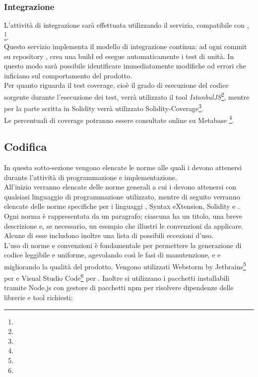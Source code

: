 \documentclass[NormeDiProgetto.tex]{subfiles}
\begin{document}
\subsubsection{Integrazione}
L'attività di integrazione sarà effettuata utilizzando il servizio, compatibile con , \textit{}\footnote{}.\\
Questo servizio implementa il modello di integrazione continua: ad ogni commit su repository ,  crea una build ed esegue automaticamente i test di unità. In questo modo sarà possibile identificare immediatamente modifiche od errori che inficiano sul comportamento del prodotto.\\
Per quanto riguarda il test coverage, cioè il grado di esecuzione del codice sorgente durante l'esecuzione dei test, verrà utilizzato il tool  \textit{IstanbulJS}\footnote{}, mentre per la parte scritta in Solidity verrà utilizzato Solidity-Coverage\footnote{}.\\
Le percentuali di coverage potranno essere consultate online su Metabase \footnote{}.

\subsection{Codifica}
In questa sotto-sezione vengono elencate le norme alle quali i \progri devono attenersi durante l'attività di programmazione e implementazione.\\
All'inizio verranno elencate delle norme generali a cui i \progri devono attenersi con qualsiasi linguaggio di programmazione utilizzato, mentre di seguito verranno elencate delle norme specifiche per i linguaggi ,  Syntax eXtension, Solidity e .\\
Ogni norma è rappresentata da un paragrafo; ciascuna ha un titolo, una breve descrizione e, se necessario, un esempio che illustri le convenzioni da applicare. Alcune di esse includono inoltre una lista di possibili eccezioni d'uso.\\
L'uso di norme e convenzioni è fondamentale per permettere la generazione di codice leggibile e uniforme, agevolando così le fasi di manutenzione,  e  e migliorando la qualità del prodotto.
Vengono utilizzati Webstorm by Jetbrains\footnote{} per  e Visual Studio Code\footnote{} per .
Inoltre si utilizzano i pacchetti installabili tramite Node.js con gestore di pacchetti npm per risolvere dipendenze delle librerie e tool richiesti;
\end{document}
